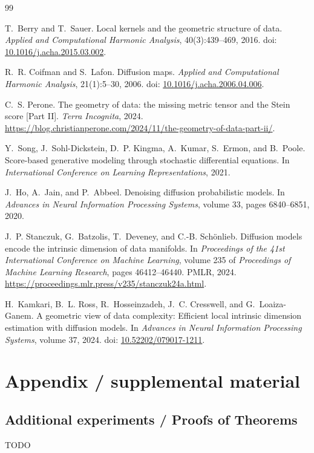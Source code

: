 \documentclass{article}
\begin{document}
\begin{thebibliography}{99}

T.~Berry and T.~Sauer.
\newblock Local kernels and the geometric structure of data.
\newblock \emph{Applied and Computational Harmonic Analysis}, 40(3):439--469, 2016.
\newblock doi: \href{https://doi.org/10.1016/j.acha.2015.03.002}{10.1016/j.acha.2015.03.002}.

R.~R. Coifman and S.~Lafon.
\newblock Diffusion maps.
\newblock \emph{Applied and Computational Harmonic Analysis}, 21(1):5--30, 2006.
\newblock doi: \href{https://doi.org/10.1016/j.acha.2006.04.006}{10.1016/j.acha.2006.04.006}.

C.~S. Perone.
\newblock The geometry of data: the missing metric tensor and the Stein score [Part II].
\newblock \emph{Terra Incognita}, 2024.
\newblock \url{https://blog.christianperone.com/2024/11/the-geometry-of-data-part-ii/}.

Y.~Song, J.~Sohl-Dickstein, D.~P. Kingma, A.~Kumar, S.~Ermon, and B.~Poole.
\newblock Score-based generative modeling through stochastic differential equations.
\newblock In \emph{International Conference on Learning Representations}, 2021.

J.~Ho, A.~Jain, and P.~Abbeel.
\newblock Denoising diffusion probabilistic models.
\newblock In \emph{Advances in Neural Information Processing Systems}, volume 33, pages 6840--6851, 2020.

J.~P. Stanczuk, G.~Batzolis, T.~Deveney, and C.-B. Sch{\"o}nlieb.
\newblock Diffusion models encode the intrinsic dimension of data manifolds.
\newblock In \emph{Proceedings of the 41st International Conference on Machine Learning}, volume 235 of \emph{Proceedings of Machine Learning Research}, pages 46412--46440. PMLR, 2024.
\newblock \url{https://proceedings.mlr.press/v235/stanczuk24a.html}.

H.~Kamkari, B.~L. Ross, R.~Hosseinzadeh, J.~C. Cresswell, and G.~Loaiza-Ganem.
\newblock A geometric view of data complexity: Efficient local intrinsic dimension estimation with diffusion models.
\newblock In \emph{Advances in Neural Information Processing Systems}, volume 37, 2024.
\newblock doi: \href{https://doi.org/10.52202/079017-1211}{10.52202/079017-1211}.

\end{thebibliography}


\newpage
\appendix
\section{Appendix / supplemental material}\label{app}

\subsection{Additional experiments / Proofs of Theorems}\label{app:exp}

TODO
\end{document}
